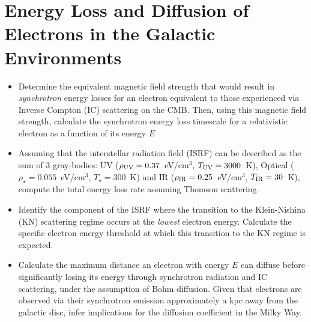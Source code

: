 \section{Energy Loss and Diffusion of Electrons in the Galactic Environments}

\begin{itemize}
\item Determine the equivalent magnetic field strength that would result in \emph{synchrotron} energy losses for an electron equivalent to those experienced via Inverse Compton (IC) scattering on the CMB. Then, using this magnetic field strength, calculate the synchrotron energy loss timescale for a relativistic electron as a function of its energy $E$

\item Assuming that the interstellar radiation field (ISRF) can be described as the sum of 3 gray-bodies: UV ($\rho_{\rm UV} = 0.37$~eV/cm$^3$, $T_{\rm UV} = 3000$~K), Optical ($\rho_{\star} = 0.055$~eV/cm$^3$, $T_{\star} = 300$~K) and IR ($\rho_{\rm IR} = 0.25$~eV/cm$^3$, $T_{\rm IR} = 30$~K), compute the total energy loss rate assuming Thomson scattering. 

\item Identify the component of the ISRF where the transition to the Klein-Nishina (KN) scattering regime occurs at the \emph{lowest} electron energy. Calculate the specific electron energy threshold at which this transition to the KN regime is expected.

\item Calculate the maximum distance an electron with energy $E$ can diffuse before significantly losing its energy through synchrotron radiation and IC scattering, under the assumption of Bohm diffusion. Given that electrons are observed via their synchrotron emission approximately a kpc away from the galactic disc, infer implications for the diffusion coefficient in the Milky Way.
\end{itemize}
